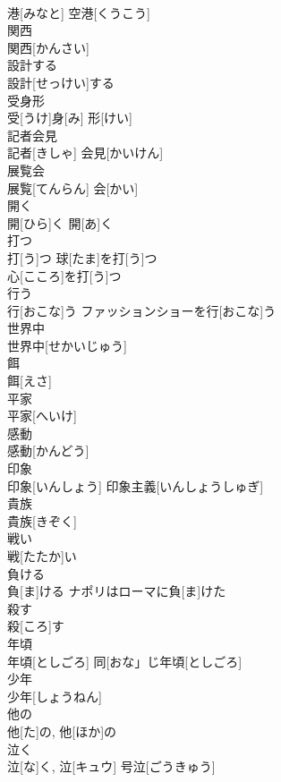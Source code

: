 \documentclass[8pt]{extreport}
\begin{document}
\begin{CJK}{UTF8}{min}
\\	港[みなと]	空港[くうこう] 
\\	関西	
\\	関西[かんさい]	
\\	設計する	
\\	設計[せっけい]する	
\\	受身形	
\\	受[うけ]身[み] 形[けい]	
\\	記者会見	
\\	記者[きしゃ] 会見[かいけん]	
\\	展覧会	
\\	展覧[てんらん] 会[かい]	
\\	開く	
\\	開[ひら]く	開[あ]く 
\\	打つ	
\\	打[う]つ	球[たま]を打[う]つ 
\\	心[こころ]を打[う]つ 
\\	行う	
\\	行[おこな]う	ファッションショーを行[おこな]う 
\\	世界中	
\\	世界中[せかいじゅう]	
\\	餌	
\\	餌[えさ]	
\\	平家	
\\	平家[へいけ]	
\\	感動	
\\	感動[かんどう]	
\\	印象	
\\	印象[いんしょう]	印象主義[いんしょうしゅぎ] 
\\	貴族	
\\	貴族[きぞく]	
\\	戦い	
\\	戦[たたか]い	
\\	負ける	
\\	負[ま]ける	ナポリはローマに負[ま]けた 
\\	殺す	
\\	殺[ころ]す	
\\	年頃	
\\	年頃[としごろ]	同[おな」じ年頃[としごろ]　
\\	少年	
\\	少年[しょうねん]	
\\	他の	
\\	他[た]の, 他[ほか]の	
\\	泣く	
\\	泣[な]く, 泣[キュウ]	号泣[ごうきゅう] 

\end{CJK}
\end{document}
